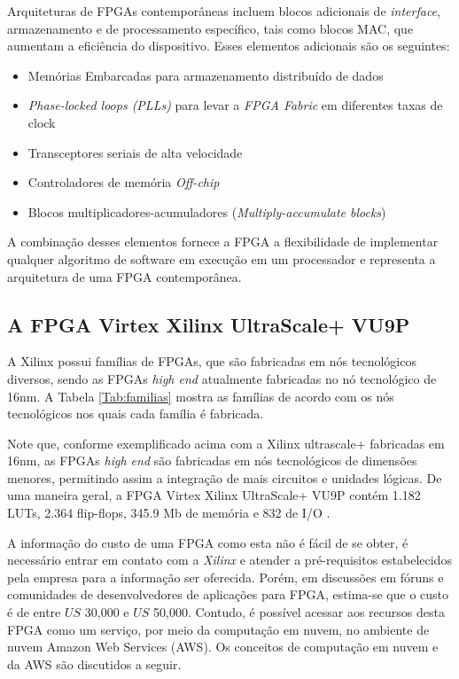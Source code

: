 Arquiteturas de FPGAs contemporâneas incluem blocos adicionais de \textit{interface}, armazenamento e de processamento específico, tais como blocos MAC, que aumentam a eficiência do dispositivo. Esses elementos adicionais são os seguintes:

\begin{itemize}
    \item Memórias Embarcadas para armazenamento distribuído de dados
    \item \textit{Phase-locked loops (PLLs)} para levar a \textit{FPGA Fabric} em diferentes taxas de clock
    \item Transceptores seriais de alta velocidade
    \item Controladores de memória \textit{Off-chip}
    \item Blocos multiplicadores-acumuladores (\textit{Multiply-accumulate blocks})
    
\end{itemize}

A combinação desses elementos fornece a FPGA a flexibilidade de implementar qualquer algoritmo de software em execução em um processador e representa a arquitetura de uma FPGA contemporânea.


\subsection{A FPGA Virtex Xilinx UltraScale+ VU9P} \label{sec:virtex}
 
 A Xilinx possui famílias de FPGAs, que são fabricadas em nós tecnológicos diversos, sendo as FPGAs \textit{high end} atualmente fabricadas no nó tecnológico de 16nm. A Tabela \ref{Tab:familias} mostra as famílias de acordo com os nós tecnológicos nos quais cada família é fabricada.

 Note que, conforme exemplificado acima com a Xilinx ultrascale+ fabricadas em 16nm, as FPGAs \textit{high end} são fabricadas em nós tecnológicos de dimensões menores, permitindo assim a integração de mais circuitos e unidades lógicas. De uma maneira geral, a FPGA  Virtex Xilinx UltraScale+ VU9P contém 1.182 LUTs, 2.364 flip-flops, 345.9 Mb de memória e 832 de I/O \cite{ultrascale}.

 A informação do custo de uma FPGA como esta não é fácil de se obter, é necessário entrar em contato com a \textit{Xilinx} e atender a pré-requisitos estabelecidos pela empresa para a informação ser oferecida. Porém, em discussões em fóruns e comunidades de desenvolvedores de aplicações para FPGA, estima-se que o custo é de entre $US$ 30,000 e $US$ 50,000. Contudo, é possível acessar aos recursos desta FPGA como um serviço, por meio da computação em nuvem, no ambiente de nuvem Amazon Web Services (AWS). Os conceitos de computação em nuvem e da AWS são discutidos a seguir.

